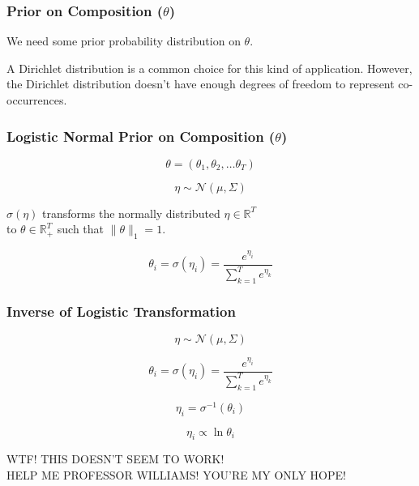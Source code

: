 \documentclass{beamer}
\providecommand{\norm}[2]{\lVert#2\rVert_#1}
\begin{document}
\begin{frame}
  \frametitle{Prior on Composition ($\theta$)}
  \begin{center}
    We need some prior probability distribution on $\theta$.
    \vspace{0.3in}

    A Dirichlet distribution is a common choice for this kind of application.
    However, the Dirichlet distribution doesn't have enough degrees of freedom to represent co-occurrences.
  \end{center}
\end{frame}

\begin{frame}
  \frametitle{Logistic Normal Prior on Composition ($\theta$)}
  \begin{center}
    \begin{equation*}
      \theta = ( \theta_1, \theta_2, \dots \theta_T )
    \end{equation*}

    \begin{equation*}
      \eta \sim \mathcal{N}(\mu, \Sigma)
    \end{equation*}

    $\sigma(\eta)$ transforms the normally distributed $\eta \in \mathbb{R}^T$ \\
    to $\theta \in \mathbb{R}_+^T$ such that $\norm{1}{\theta} = 1$.

    \begin{equation*}
      \theta_i = \sigma(\eta_i) = \frac{e^{\eta_i}}{\sum_{k=1}^{T}e^{\eta_k}}
    \end{equation*}
  \end{center}
\end{frame}

\begin{frame}
  \frametitle{Inverse of Logistic Transformation}
  \begin{center}
    \begin{equation*}
      \eta \sim \mathcal{N}(\mu, \Sigma)
    \end{equation*}

    \begin{equation*}
      \theta_i = \sigma(\eta_i) = \frac{e^{\eta_i}}{\sum_{k=1}^{T}e^{\eta_k}}
    \end{equation*}

    \begin{equation*}
      \eta_i = \sigma^{-1}(\theta_i)
    \end{equation*}

    \begin{equation*}
      \eta_i \propto \ln \theta_i
    \end{equation*}

    WTF! THIS DOESN'T SEEM TO WORK! \\
    HELP ME PROFESSOR WILLIAMS! YOU'RE MY ONLY HOPE!
  \end{center}
\end{frame}
\end{document}
